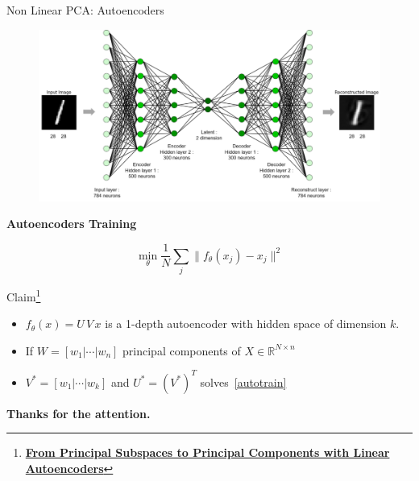 \documentclass[10pt]{beamer}
\theoremstyle{definition}
\newcommand{\R}{\mathbb{R}}
\newcommand{\1}{\mathbbm{1}}
\begin{document}
\begin{frame}{Non Linear PCA: Autoencoders}
  \begin{minipage}[t]{0.5\textwidth}
      \begin{figure}[h!]
      \centering
      \includegraphics[scale=0.15, trim=0 0 0 5cm]{./pic/enc-dec.png}
    \end{figure}
  \end{minipage}%
  \begin{minipage}[t]{0.5\textwidth}
    \begin{center}
      {\bf Autoencoders Training}
    \end{center}
    \begin{equation}
      \min_\theta \frac{1}{N}\sum_{j} \|f_\theta(x_j) - x_j\|^2
      \label{autotrain}
      \tag{mP}
    \end{equation}
  \end{minipage}
  \vfill
{} 
\begin{block}{Claim\footnote{\href{https://arxiv.org/pdf/1804.10253.pdf}{\bf
      From Principal Subspaces to Principal Components with Linear
Autoencoders}}}
  \begin{itemize}
    \item $f_\theta(x)= U\,V\,x$ is a 1-depth autoencoder with hidden space of
    dimension $k$.
  \item If $W=[w_1|\cdots|w_n]$ principal components of $X\in\R^{N\times n}$
  \item $V^*= [w_1|\cdots|w_k]$ and $U^*=(V^*)^T$ solves~\ref{autotrain}
  \end{itemize}
\end{block}
\end{frame}
\begin{frame}
  \begin{center}
    {\bf Thanks for the attention.}
  \end{center}
\end{frame}
\appendix
\end{document}
